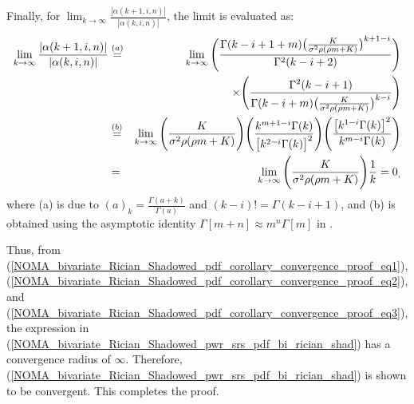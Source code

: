 Finally, for $\lim_{k \to \infty} \frac{|\alpha(k+1,i,n)|}{|\alpha(k,i,n)|}$, the limit is evaluated as:
\begin{eqnarray}
\lim_{k \to \infty} \frac{|\alpha(k+1,i,n)|}{|\alpha(k,i,n)|} & \stackrel{(a)}{=} & \lim_{k \to \infty} \Bigg( \frac{\Gamma(k-i+1+m) \big( \frac{K}{\sigma^2 \rho (\rho m + K)} \big)^{k+1-i}}{\Gamma^2(k-i+2)} \Bigg) \nonumber \\
 & & \hspace{0.5cm} \times \Bigg( \frac{\Gamma^2(k-i+1)}{\Gamma(k-i+m) \big( \frac{K}{\sigma^2 \rho (\rho m + K)} \big)^{k-i}} \Bigg) \nonumber \\
 & \stackrel{(b)}{=} & \lim_{k \to \infty} \Bigg( \frac{K}{\sigma^2 \rho (\rho m + K)} \Bigg) \Bigg( \frac{k^{m+1-i}\Gamma(k)}{\big[k^{2-i}\Gamma(k)\big]^2} \Bigg) \Bigg( \frac{\big[k^{1-i}\Gamma(k)\big]^2}{k^{m-i}\Gamma(k)} \Bigg) \nonumber \\
 & = & \lim_{k \to \infty} \Bigg( \frac{K}{\sigma^2 \rho (\rho m + K)} \Bigg) \frac{1}{k} = 0_, \label{NOMA_bivariate_Rician_Shadowed_pdf_corollary_convergence_proof_eq3}
\end{eqnarray}
where (a) is due to $(a)_k=\frac{\Gamma(a+k)}{\Gamma(a)}$ \cite[eq. (6.1.22)]{abramowitz1964handbook} and $(k-i)! = \Gamma(k-i+1)$, and (b) is obtained using the asymptotic identity $\Gamma[m+n] \approx m^n\Gamma[m]$ in \cite[eq. (25)]{rached2017unified}.

Thus, from (\ref{NOMA_bivariate_Rician_Shadowed_pdf_corollary_convergence_proof_eq1}), (\ref{NOMA_bivariate_Rician_Shadowed_pdf_corollary_convergence_proof_eq2}), and (\ref{NOMA_bivariate_Rician_Shadowed_pdf_corollary_convergence_proof_eq3}), the expression in (\ref{NOMA_bivariate_Rician_Shadowed_pwr_srs_pdf_bi_rician_shad}) has a convergence radius of $\infty$. Therefore, (\ref{NOMA_bivariate_Rician_Shadowed_pwr_srs_pdf_bi_rician_shad}) is shown to be convergent. This completes the proof.

